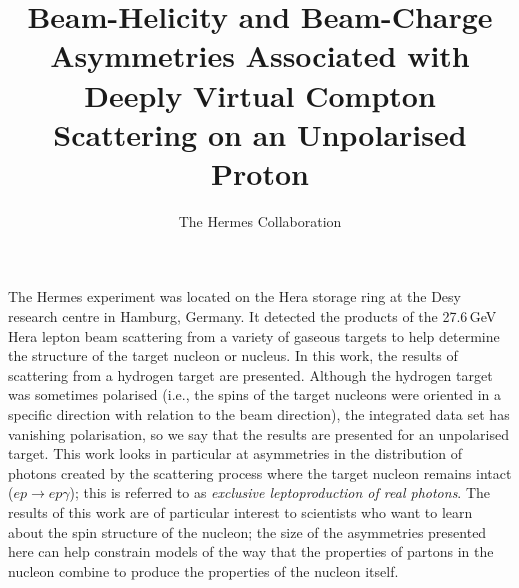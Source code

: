 \documentclass[11pt]{article}
\begin{document}
\title{Beam-Helicity and Beam-Charge Asymmetries Associated with Deeply Virtual Compton Scattering on an Unpolarised Proton}
\author{The {\sc Hermes } Collaboration}

\maketitle

The H{\sc ermes} experiment was located on the H{\sc era} storage ring at the D{\sc esy} research centre in Hamburg, Germany. It detected the products of the 27.6\,GeV H{\sc era} lepton beam scattering from a variety of gaseous targets to help determine the structure of the target nucleon or nucleus. In this work, the results of scattering from a hydrogen target are presented. Although the hydrogen target was sometimes polarised (i.e., the spins of the target nucleons were oriented in a specific direction with relation to the beam direction), the integrated data set has vanishing polarisation, so we say that the results are presented for an unpolarised target. This work looks in particular at asymmetries in the distribution of photons created by the scattering process where the target nucleon remains intact ($ep\rightarrow ep\gamma$); this is referred to as \emph{exclusive leptoproduction of real photons}. The results of this work are of particular interest to scientists who want to learn about the spin structure of the nucleon; the size of the asymmetries presented here can help constrain models of the way that the properties of partons in the nucleon combine to produce the properties of the nucleon itself.
\end{document}
